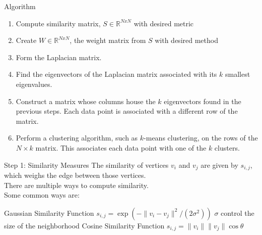 \documentclass{beamer}
\begin{document}
\begin{frame}{Algorithm}
    \begin{enumerate}
        \item Compute similarity matrix, $S \in \mathbb{R}^{NxN}$ with desired metric 
        \item Create $W \in \mathbb{R}^{NxN}$, the weight matrix from $S$ with desired method 
        \item Form the Laplacian matrix. 
        \item Find the eigenvectors of the Laplacian matrix associated with its $k$ smallest eigenvalues.
        \item Construct a matrix whose columns house the $k$ eigenvectors found in the previous steps. Each data point is associated with a different row of the matrix. 
        \item Perform a clustering algorithm, such as $k$-means clustering, on the rows of the $N \times k$ matrix. This associates each data point with one of the $k$ clusters.
    \end{enumerate}
\end{frame}

\begin{frame}{Step 1: Similarity Measures}
    The similarity of vertices $v_i$ and $v_j$ are given by $s_{i,j}$, which weighs the edge between those vertices. \\ \vspace{0.25 cm} There are multiple ways to compute similarity. \\ \vspace{0.25 cm}Some common ways are:
    \vspace{0.25 cm}
    \begin{outline}
        \1 Gaussian Similarity Function
            \2 $s_{i,j} =  \exp( - \| v_i - v_j\|^2 / (2\sigma^2))$
                \3 $\sigma$ control the size of the neighborhood 
        \1 Cosine Similarity Function
            \2 $s_{i,j} = \|v_i\|\|v_j\| \cos \theta$
    \end{outline}
\end{frame}
\end{document}

